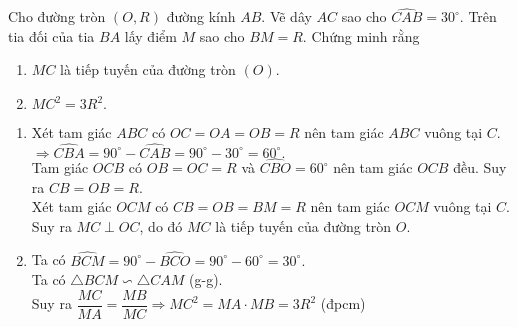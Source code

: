 \begin{bt}
Cho đường tròn $(O,R)$ đường kính $AB$. Vẽ dây $AC$ sao cho $\widehat{CAB}=30^{\circ}$. Trên tia đối của tia $BA$ lấy điểm $M$ sao cho $BM=R$. Chứng minh rằng
\begin{enumerate}
\item $MC$ là tiếp tuyến của đường tròn $(O)$.
\item $MC^2=3R^2.$
\end{enumerate}
\loigiai
{
\begin{center}
\end{center}
\begin{enumerate}
\item Xét tam giác $ABC$ có $OC=OA=OB=R$ nên tam giác $ABC$ vuông tại $C$.\\
$\Rightarrow \widehat{CBA}=90^{\circ}-\widehat{CAB}=90^{\circ}-30^{\circ}=60^{\circ}.$\\
Tam giác $OCB$ có $OB=OC=R$ và $\widehat{CBO}=60^{\circ}$ nên tam giác $OCB$ đều. Suy ra $CB=OB=R$.\\
Xét tam giác $OCM$ có $CB=OB=BM=R$ nên tam giác $OCM$ vuông tại $C$.\\
Suy ra $MC \perp OC$, do đó $MC$ là tiếp tuyến của đường tròn $O$.
\item Ta có $\widehat{BCM}=90^{\circ}-\widehat{BCO}=90^{\circ}-60^{\circ}=30^{\circ}.$\\
Ta có $\triangle BCM \backsim \triangle CAM$ (g-g).\\
Suy ra $\dfrac{MC}{MA}=\dfrac{MB}{MC} \Rightarrow MC^2=MA \cdot MB=3R^2$ (đpcm)
\end{enumerate}
}
\end{bt}
  
